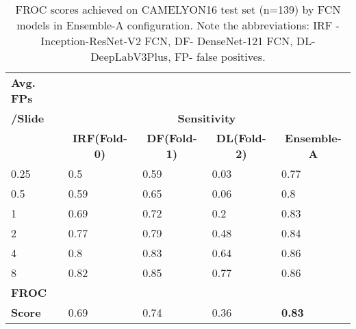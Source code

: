 \documentclass[times,twocolumn,final,authoryear]{tmp}
\begin{document}
\begin{table}[!h]
\centering
\caption{FROC scores achieved on CAMELYON16 test set (n=139) by FCN models in Ensemble-A configuration. Note the abbreviations: IRF - Inception-ResNet-V2 FCN, DF- DenseNet-121 FCN, DL- DeepLabV3Plus, FP- false positives.}
\label{path_tab:EnsA-FROC}
\setlength{\tabcolsep}{3pt}
\begin{tabular}{@{}lllll@{}}
  
\textbf{Avg. FPs} & \\
    \textbf{/Slide} &  \multicolumn{4}{c}{\textbf{Sensitivity}}\\    
\textbf{}            & \multicolumn{1}{c}{\textbf{IRF(Fold-0)}} & \multicolumn{1}{c}{\textbf{DF(Fold-1)}} & \multicolumn{1}{c}{\textbf{DL(Fold-2)}} & \multicolumn{1}{c}{\textbf{Ensemble-A}} \\
0.25                      & 0.5                                       & 0.59                                     & 0.03                                     & 0.77                                    \\
0.5                       & 0.59                                      & 0.65                                     & 0.06                                     & 0.8                                     \\
1                         & 0.69                                      & 0.72                                     & 0.2                                      & 0.83                                    \\
2                         & 0.77                                      & 0.79                                     & 0.48                                     & 0.84                                    \\
4                         & 0.8                                       & 0.83                                     & 0.64                                     & 0.86                                    \\
8                         & 0.82                                      & 0.85                                     & 0.77                                     & 0.86                                    \\
\textbf{FROC} &&& \\
\textbf{Score}       & 0.69                                      & 0.74                                     & 0.36                                     &\textbf{0.83}                                    \\  
\end{tabular}\end{table}
\end{document}
